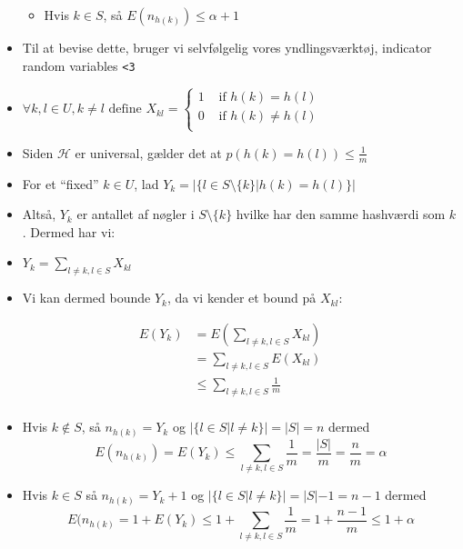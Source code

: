 \documentclass{beamer}
\begin{document}
\begin{frame}[allowframebreaks]
\begin{itemize}
\begin{itemize}
\item Hvis $k \in S$, så $E(n_{h(k)}) \leq \alpha + 1$
\end{itemize}
\item Til at bevise dette,  bruger vi selvfølgelig vores yndlingsværktøj, indicator random variables \texttt{<3}
\item $\forall k,l \in U, k \neq l \text{ define } X_{kl} = \begin{cases}
  1 & \text{ if }h(k) = h(l) \\
  0 & \text{ if } h(k) \neq h(l) \\
\end{cases}$
\item Siden $\mathcal{H}$ er universal, gælder det at $p(h(k) = h(l)) \leq \frac{1}{m}$
\item For et ``fixed'' $k \in U$, lad $Y_{k} = |\{ l \in S \setminus \{k\} | h(k) = h(l) \}|$
\item Altså, $Y_k$  er antallet af nøgler i $S \setminus \{k\}$ hvilke har den samme hashværdi som $k$. Dermed har vi:
\item $Y_{k} = \sum_{l \neq k, l \in S}^{}X_{kl}$
\item Vi kan dermed bounde $Y_{k}$, da vi kender et bound på $X_{kl}$:
\end{itemize}

\begin{equation}
\begin{split}
  E(Y_{k}) &= E(\sum_{l \neq k, l \in S}^{}X_{kl}) \\
           &= \sum_{l \neq k, l \in S}^{} E(X_{kl})\\
           &\leq \sum_{l \neq k, l \in S}^{} \frac{1}{m}\\
\end{split}
\end{equation}

\begin{itemize}
\item Hvis $k \notin S$, så $n_{h(k)} = Y_{k}$ og $|\{l \in S|l \neq k\}| = |S| = n$ dermed
  \[ E(n_{h(k)}) = E(Y_{k}) \leq \sum_{l \neq k, l \in S}^{} \frac{1}{m} = \frac{|S|}{m} = \frac{n}{m} = \alpha \]

\item Hvis $k \in S$ så $n_{h(k)} = Y_{k}+1$ og $|\{l \in S | l \neq k\}| = |S| - 1 = n - 1$ dermed
  \[ E(n_{h(k)} = 1 + E(Y_{k}) \leq 1 + \sum_{l \neq k, l \in S}^{} \frac{1}{m} = 1 + \frac{n-1}{m} \leq 1 + \alpha \]
\end{itemize}
\end{frame}
\end{document}
